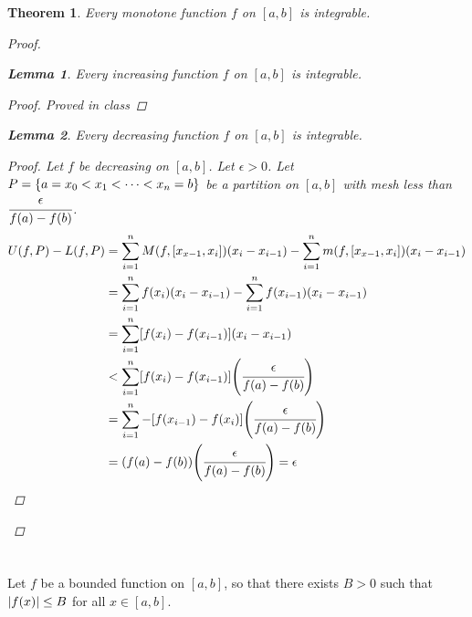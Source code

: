 \documentclass[]{article}
\newtheorem{theorem}{Theorem}
\newtheorem{lemma}{Lemma}
\begin{document}
\begin{theorem}
    Every monotone function $f$ on $[a,b]$ is integrable.
    \begin{proof}
        \begin{lemma}
            Every increasing function $f$ on $[a,b]$ is integrable.
            \begin{proof}
                Proved in class
            \end{proof}
        \end{lemma}
        \begin{lemma}
            Every decreasing function $f$ on $[a,b]$ is integrable.
            \begin{proof}
                Let $f$ be decreasing on $[a,b]$.
                Let $\epsilon>0$.
                Let $P = \qty{a=x_0<x_1<\dots<x_n=b}$ be a partition on $[a,b]$ with mesh less than $\cfrac{\epsilon}{f(a)-f(b)}$.
                \begin{align*}
                    U(f,P) - L(f,P) 
                        &= \sum_{i=1}^n M(f,[x_{x-1},x_{i}])(x_{i}-x_{i-1}) 
                            - \sum_{i=1}^n m(f,[x_{x-1},x_{i}])(x_{i}-x_{i-1})\\
                        &= \sum_{i=1}^n f(x_i) (x_{i}-x_{i-1}) 
                            - \sum_{i=1}^n f(x_{i-1}) (x_{i}-x_{i-1})\\
                        &= \sum_{i=1}^n [f(x_i) - f(x_{i-1})] (x_{i}-x_{i-1})\\
                        &< \sum_{i=1}^n [f(x_i) - f(x_{i-1})] \qty(\cfrac{\epsilon}{f(a)-f(b)})\\
                        &= \sum_{i=1}^n -[f(x_{i-1}) - f(x_{i})] \qty(\cfrac{\epsilon}{f(a)-f(b)})\\
                        &= \qty(f(a) - f(b)) \qty(\cfrac{\epsilon}{f(a)-f(b)}) = \epsilon
                \end{align*}
            \end{proof}
        \end{lemma}
    \end{proof}
\end{theorem}

\newpage
\section{}
Let $f$ be a bounded function on $[a,b]$, so that there exists $B>0$ such that $\abs{f(x)}\leq B$ for all $x\in [a,b]$.
\end{document}
